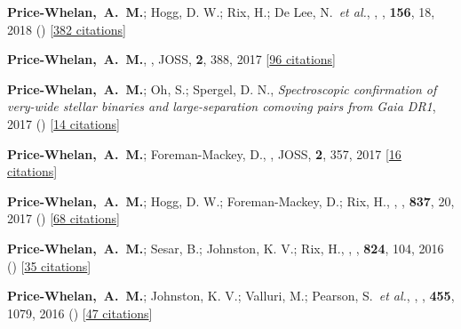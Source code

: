 \item[{\color{deemph}\scriptsize12}]\textbf{Price-Whelan,~A.~M.}; Hogg, D. W.; Rix, H.; De Lee, N.~\textit{et al.}, , \aj, \textbf{156}, 18, 2018 () [\href{http://adsabs.harvard.edu/abs/2018AJ....156...18P}{382 citations}]

\item[{\color{deemph}\scriptsize11}]\textbf{Price-Whelan,~A.~M.}, , JOSS, \textbf{2}, 388, 2017 [\href{http://adsabs.harvard.edu/abs/2017JOSS....2..388P}{96 citations}]

\item[{\color{deemph}\scriptsize10}]\textbf{Price-Whelan,~A.~M.}; Oh, S.; Spergel, D. N., \textit{Spectroscopic confirmation of very-wide stellar binaries and large-separation comoving pairs from Gaia DR1}, 2017 () [\href{http://adsabs.harvard.edu/abs/2017arXiv170903532P}{14 citations}]

\item[{\color{deemph}\scriptsize9}]\textbf{Price-Whelan,~A.~M.}; Foreman-Mackey, D., , JOSS, \textbf{2}, 357, 2017 [\href{http://adsabs.harvard.edu/abs/2017JOSS....2..357P}{16 citations}]

\item[{\color{deemph}\scriptsize8}]\textbf{Price-Whelan,~A.~M.}; Hogg, D. W.; Foreman-Mackey, D.; Rix, H., , \apj, \textbf{837}, 20, 2017 () [\href{http://adsabs.harvard.edu/abs/2017ApJ...837...20P}{68 citations}]

\item[{\color{deemph}\scriptsize7}]\textbf{Price-Whelan,~A.~M.}; Sesar, B.; Johnston, K. V.; Rix, H., , \apj, \textbf{824}, 104, 2016 () [\href{http://adsabs.harvard.edu/abs/2016ApJ...824..104P}{35 citations}]

\item[{\color{deemph}\scriptsize6}]\textbf{Price-Whelan,~A.~M.}; Johnston, K. V.; Valluri, M.; Pearson, S.~\textit{et al.}, , \mnras, \textbf{455}, 1079, 2016 () [\href{http://adsabs.harvard.edu/abs/2016MNRAS.455.1079P}{47 citations}]

